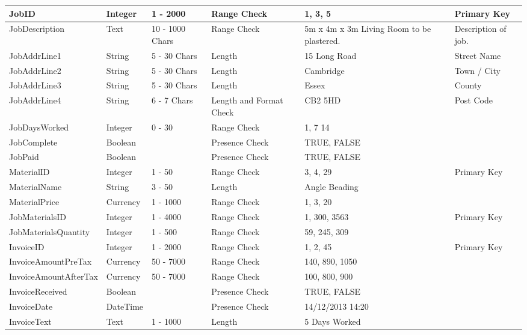 \begin{flushleft}
\begin{longtable}{|p{3.6cm}|p{1.5cm}|p{2cm}|p{2cm}|p{2cm}|p{2cm}|}
JobID & Integer & 1 - 2000 & Range Check & 1, 3, 5 & Primary Key \\ \hline
JobDescription & Text & 10 - 1000 Chars & Range Check & 5m x 4m x 3m Living Room to be plastered. & Description of job. \\ \hline
JobAddrLine1 & String & 5 - 30 Chars & Length & 15 Long Road & Street Name \\ \hline
JobAddrLine2 & String & 5 - 30 Chars & Length & Cambridge & Town / City \\ \hline
JobAddrLine3 & String & 5 - 30 Chars & Length & Essex & County \\ \hline
JobAddrLine4 & String & 6 - 7 Chars & Length and Format Check & CB2 5HD & Post Code \\ \hline
JobDaysWorked & Integer & 0 - 30 & Range Check & 1, 7 14 &  \\ \hline
JobComplete & Boolean &  & Presence Check & TRUE, FALSE &  \\ \hline
JobPaid & Boolean &  & Presence Check & TRUE, FALSE &  \\ \hline \hline



MaterialID & Integer & 1 - 50 & Range Check & 3, 4, 29 & Primary Key \\ \hline
MaterialName & String & 3 - 50 & Length & Angle Beading &  \\ \hline  
MaterialPrice & Currency & 1 - 1000 & Range Check & 1, 3, 20 &  \\ \hline \hline


JobMaterialsID & Integer & 1 - 4000 & Range Check & 1, 300, 3563 & Primary Key \\ \hline
JobMaterialsQuantity & Integer & 1 - 500 & Range Check & 59, 245, 309 & \\ \hline \hline 


InvoiceID & Integer & 1 - 2000 & Range Check & 1, 2, 45 & Primary Key \\ \hline
InvoiceAmountPreTax & Currency & 50 - 7000 & Range Check & 140, 890, 1050 &  \\ \hline
InvoiceAmountAfterTax & Currency & 50 - 7000 & Range Check & 100, 800, 900 &  \\ \hline
InvoiceReceived & Boolean &  & Presence Check & TRUE, FALSE &  \\ \hline
InvoiceDate & DateTime &  & Presence Check & 14/12/2013 14:20 &  \\ \hline
InvoiceText & Text & 1 - 1000 & Length & 5 Days Worked &  \\ \hline \hline




\end{longtable}
\end{flushleft}
